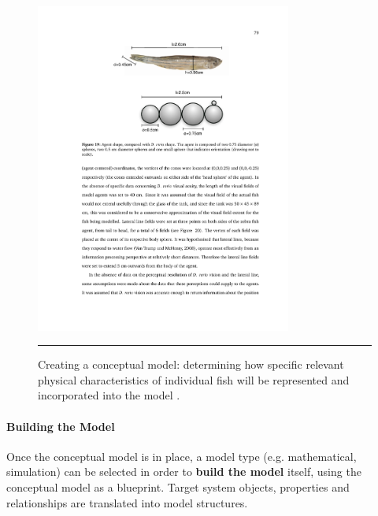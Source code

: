 \begin{figure}[!t]
	\centering
		\includegraphics[width=0.75\textwidth]{images/SIM/knowledge_to_model.pdf}
	\caption[\small Representing the physical characteristics of individual fish]{\small Creating a conceptual model: determining how specific relevant physical characteristics of individual fish will be represented and incorporated into the model \cite{SIM_S}.}
	\label{simfig:7}\hrule
\end{figure}


\paragraph{Building the Model}

Once the conceptual model is in place, a model type (e.g. mathematical, simulation) can be selected in order to \textbf{build the model} itself, using the conceptual model as a blueprint. Target system objects, properties and relationships are translated into model structures.

